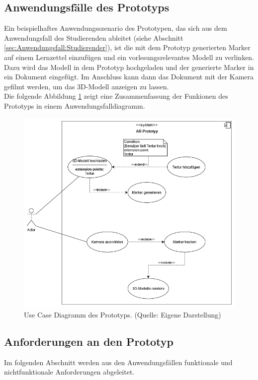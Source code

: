 \subsection{Anwendungsfälle des Prototyps}
Ein beispielhaftes Anwendungsszenario des Prototypen, das sich aus dem Anwendungsfall des Studierenden ableitet (siehe Abschnitt \ref{sec:Anwendungsfall:Studierender}), ist die mit dem Prototyp generierten Marker auf einem Lernzettel einzufügen und ein vorlesungsrelevantes Modell zu verlinken. Dazu wird das Modell in dem Prototyp hochgeladen und der generierte Marker in ein Dokument eingefügt. Im Anschluss kann dann das Dokument mit der Kamera gefilmt werden, um das 3D-Modell anzeigen zu lassen.\\
Die folgende Abbildung \ref{fig:Use-Cases} zeigt eine Zusammenfassung der Funkionen des Prototyps in einem Anwendungsfalldiagramm.
\begin{figure}[h!]
\centering
\includegraphics[width=1.0\textwidth]{Abbildungen/Use-Case-Diagramm.png}
\caption[Use Cases des Prototyps]{Use Case Diagramm des Prototyps. (Quelle: Eigene Darstellung)}
\label{fig:Use-Cases}
\end{figure}

\subsection{Anforderungen an den Prototyp}
Im folgenden Abschnitt werden aus den Anwendungsfällen funktionale und nichtfunktionale Anforderungen abgeleitet. 
